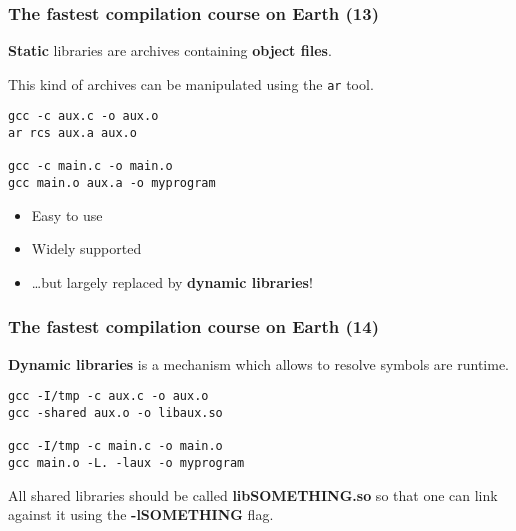 \documentclass[hyperref={pdfpagelabels=false}]{beamer}
\begin{document}
\begin{frame}[fragile]
\frametitle{The fastest compilation course on Earth (13)}

\textbf{Static} libraries are archives containing \textbf{object
  files}.

This kind of archives can be manipulated using the \texttt{ar} tool.

\vspace{0.3cm}

\begin{verbatim}
gcc -c aux.c -o aux.o
ar rcs aux.a aux.o

gcc -c main.c -o main.o
gcc main.o aux.a -o myprogram
\end{verbatim}

\vspace{0.3cm}

\begin{itemize}
\item Easy to use
\item Widely supported
\item \ldots but largely replaced by \textbf{dynamic libraries}!
\end{itemize}

\end{frame}



\begin{frame}[fragile]
\frametitle{The fastest compilation course on Earth (14)}

\textbf{Dynamic libraries} is a mechanism which allows to resolve
symbols are runtime.

\begin{verbatim}
gcc -I/tmp -c aux.c -o aux.o
gcc -shared aux.o -o libaux.so

gcc -I/tmp -c main.c -o main.o
gcc main.o -L. -laux -o myprogram
\end{verbatim}

All shared libraries should be called \textbf{libSOMETHING.so} so that
one can link against it using the \textbf{-lSOMETHING} flag.
\end{frame}
\end{document}
